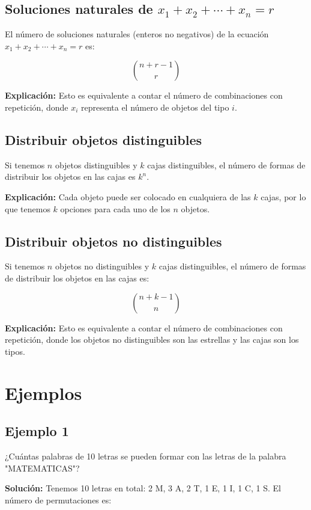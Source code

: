 \documentclass[letterpaper, 12pt]{article}
\begin{document}
	\subsection{Soluciones naturales de $x_1 + x_2 + \cdots + x_n = r$}
	
	El número de soluciones naturales (enteros no negativos) de la ecuación $x_1 + x_2 + \cdots + x_n = r$ es:
	
	$$\binom{n+r-1}{r}$$
	
	\textbf{Explicación:} Esto es equivalente a contar el número de combinaciones con repetición, donde $x_i$ representa el número de objetos del tipo $i$.
	
	\subsection{Distribuir objetos distinguibles}
	
	Si tenemos $n$ objetos distinguibles y $k$ cajas distinguibles, el número de formas de distribuir los objetos en las cajas es $k^n$.
	
	\textbf{Explicación:} Cada objeto puede ser colocado en cualquiera de las $k$ cajas, por lo que tenemos $k$ opciones para cada uno de los $n$ objetos.
	
	\subsection{Distribuir objetos no distinguibles}
	
	Si tenemos $n$ objetos no distinguibles y $k$ cajas distinguibles, el número de formas de distribuir los objetos en las cajas es:
	
	$$\binom{n+k-1}{n}$$
	
	\textbf{Explicación:} Esto es equivalente a contar el número de combinaciones con repetición, donde los objetos no distinguibles son las estrellas y las cajas son los tipos.
	
	\section{Ejemplos}
	
	\subsection{Ejemplo 1}
	
	¿Cuántas palabras de 10 letras se pueden formar con las letras de la palabra "MATEMATICAS"?
	
	\textbf{Solución:} Tenemos 10 letras en total: 2 M, 3 A, 2 T, 1 E, 1 I, 1 C, 1 S. El número de permutaciones es:
	
\end{document}
